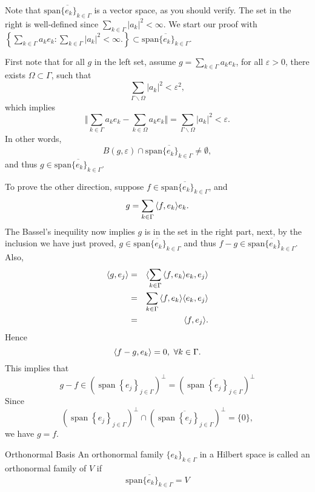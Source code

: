 \begin{Proof}
Note that $\overline{\mathrm{span}\{e_k\}_{k \in \Gamma}}$ is a vector space, as you should verify.
The set in the right is well-defined since $\sum_{k \in \Gamma}|a_k|^2 < \infty$. We start our proof with $\left\{ \sum_{k \in \Gamma}a_ke_k:  \sum_{k \in \Gamma}|a_k|^2 < \infty. \right\} \subset \overline{\mathrm{span}\{e_k\}_{k \in \Gamma}}$. \par
First note that for all $g$ in the left set, assume $g=\sum_{k \in \Gamma}a_ke_k$, for all $\varepsilon>0$, there exists $\Omega \subset \Gamma$, such that 
$$ 
\sum_{\Gamma \backslash \Omega}|a_k|^2 < \varepsilon^2,
$$
which implies 
$$
\Vert \sum_{k \in \Gamma}a_ke_k -\sum_{k \in \Omega}a_ke_k \Vert=\sum_{\Gamma \backslash \Omega}|a_k|^2 < \varepsilon.
$$
In other words, 
$$
B(g,\varepsilon)\cap \overline{\mathrm{span}\{e_k\}_{k \in \Gamma}} \neq\emptyset,
$$
and thus $g \in \overline{\mathrm{span}\{e_k\}_{k \in \Gamma}}$. \par
To prove the other direction, suppose $f \in \overline{\mathrm{span}\{e_k\}_{k \in \Gamma}}$, and 
$$
g = \sum_{k \in \Gamma}{\langle f,e_k\rangle}e_k.
$$
The Bassel's inequility now implies $g$ is in the set in the right part, next, by the inclusion we have just proved, $g\in \overline{\mathrm{span}\{e_k\}_{k \in \Gamma}}$ and thus $f-g \in \overline{\mathrm{span}\{e_k\}_{k \in \Gamma}}$.
Also,
\begin{eqnarray*}
	{\langle g,e_j\rangle} &=& {\langle \sum_{k \in \Gamma}{\langle f,e_k\rangle}e_k,e_j\rangle} \\
	&=& \sum_{k \in \Gamma}{\langle f,e_k\rangle}{\langle e_k,e_j\rangle} \\
	&=& {\langle f,e_j\rangle}.
\end{eqnarray*}
Hence 
$$
{\langle f-g,e_k\rangle}=0, \ \forall k \in \Gamma.
$$
This implies that 
$$
g-f \in\left(\operatorname{span}\left\{e_j\right\}_{j \in \Gamma}\right)^{\perp}=\left(\overline{\operatorname{span}\left\{e_j\right\}_{j \in \Gamma}}\right)^{\perp}
$$
Since $$
\left(\operatorname{span}\left\{e_j\right\}_{j \in \Gamma}\right)^{\perp} \cap \left(\overline{\operatorname{span}\left\{e_j\right\}_{j \in \Gamma}}\right)^{\perp} = \{0\},
$$
we have $g=f$.
\end{Proof}


\begin{sdefinition}{Orthonormal Basis}{}
An orthonormal family $\{e_k\}_{k \in \Gamma}$ in a Hilbert space is called an orthonormal family of $V$ if
$$
\overline{\mathrm{span}\{e_k\}_{k \in \Gamma}}= V
$$
	
\end{sdefinition}

